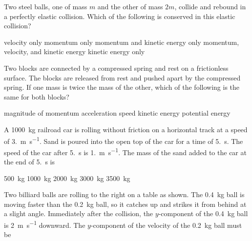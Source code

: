 \documentclass{../../../oss-ap12ibhl}
\begin{document}
\begin{questions}
  \question Two steel balls, one of mass $m$ and the other of mass $2m$,
  collide and rebound in a perfectly elastic collision. Which of the following
  is conserved in this elastic collision?
  \begin{choices}
    \choice velocity only
    \choice momentum only
    \choice momentum and kinetic energy only
    \choice momentum, velocity, and kinetic energy
    \choice kinetic energy only
  \end{choices}
    
  \question Two blocks are connected by a compressed spring and rest on a
  frictionless surface. The blocks are released from rest and pushed apart by
  the compressed spring. If one mass is twice the mass of the other, which of
  the following is the same for both blocks?
  \begin{choices}
    \choice magnitude of momentum
    \choice acceleration
    \choice speed
    \choice kinetic energy
    \choice potential energy
  \end{choices}

  \question A \SI{1000}{\kilo\gram} railroad car is rolling without friction on
  a horizontal track at a speed of \SI{3.}{\metre\per\second}. Sand is poured
  into the open top of the car for a time of \SI{5.}{\second}. The speed of
  the car after \SI{5.}{\second} is \SI{1.}{\metre\per\second}. The mass of
  the sand added to the car at the end of \SI{5.}{\second} is

  \begin{minipage}{.4\linewidth}
  \end{minipage}
  \begin{minipage}{.4\linewidth}
    \begin{choices}
      \choice\SI{500 }{\kilo\gram}
      \choice\SI{1000}{\kilo\gram}
      \choice\SI{2000}{\kilo\gram}
      \choice\SI{3000}{\kilo\gram}
      \choice\SI{3500}{\kilo\gram}
    \end{choices}
  \end{minipage}
  
  \question Two billiard balls are rolling to the right on a table as shown. The
  \SI{.4}{\kilo\gram} ball is moving faster than the \SI{.2}{\kilo\gram} ball,
  so it catches up and strikes it from behind at a slight angle. Immediately
  after the collision, the $y$-component of the \SI{.4}{\kilo\gram} ball is
  \SI{2}{\metre\per\second} downward. The $y$-component of the velocity of the
  \SI{.2}{\kilo\gram} ball must be


\end{questions}
\end{document}
